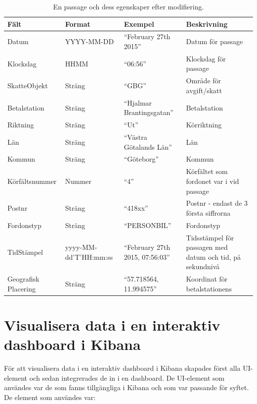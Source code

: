 \documentclass{kththesis}
\begin{document}
\captionsetup[table]{name=Tabell}

\begin{table}[h!]
  \begin{center}
    \caption{En passage och dess egenskaper efter modifiering.}
    \label{tab:table1}
    \begin{tabular}{|p{3cm}|p{3cm}|p{3cm}|p{3cm}|}
         \hline
      \textbf{Fält} & \textbf{Format} & \textbf{Exempel} & \textbf{Beskrivning}\\
      \hline
      Datum & YYYY-MM-DD & “February 27th 2015” & Datum för passage\\ %
        \hline
      Klockslag & HHMM& “06:56” & Klockslag för passage\\ %
        \hline
      SkatteObjekt & Sträng & “GBG”
 & Område för avgift/skatt\\ %
        \hline
      Betalstation & Sträng & “Hjalmar Brantingsgatan” & Betalstation\\ %
        \hline
      Riktning & Sträng & “Ut” & Körriktning\\ %
        \hline
      Län & Sträng & “Västra Götalands Län” & Län\\ %
        \hline
      Kommun & Sträng & “Göteborg” & Kommun\\ %
        \hline
      Körfältsnummer & Nummer & “4” &  Körfältet som fordonet var i vid passage\\ %
        \hline
          Postnr & Sträng & “418xx”
 & Postnr - endast de 3 första siffrorna\\ %
        \hline
          Fordonstyp & Sträng & “PERSONBIL” & Fordonstyp\\ %
        \hline
          TidStämpel & yyyy-MM-dd'T'HH:mm:ss
 & “February 27th 2015, 07:56:03” & Tidsstämpel för passagen med datum och tid, på sekundnivå 
\\ %
        \hline
Geografisk Placering & Sträng & “57.718564, 11.994575” & 
Koordinat för betalstationens 
\\ %
        \hline
    \end{tabular}
  \end{center}
\end{table}


\section{Visualisera data i en interaktiv dashboard i Kibana}

För att visualisera data i en interaktiv dashboard i Kibana skapades först alla UI-element och sedan integrerades de in i en dashboard. De UI-element som användes var de som fanns tillgängliga i Kibana och som var passande för syftet. De element som användes var:
\end{document}
